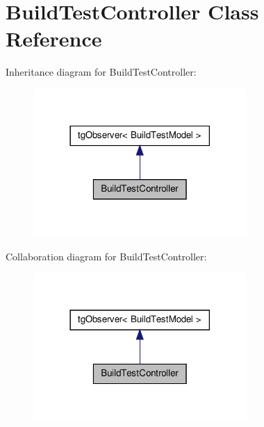 \hypertarget{class_build_test_controller}{\section{Build\-Test\-Controller Class Reference}
\label{class_build_test_controller}
}


Inheritance diagram for Build\-Test\-Controller\-:\nopagebreak
\begin{figure}[H]
\begin{center}
\leavevmode
\includegraphics[width=230pt]{class_build_test_controller__inherit__graph}
\end{center}
\end{figure}


Collaboration diagram for Build\-Test\-Controller\-:\nopagebreak
\begin{figure}[H]
\begin{center}
\leavevmode
\includegraphics[width=230pt]{class_build_test_controller__coll__graph}
\end{center}
\end{figure}
